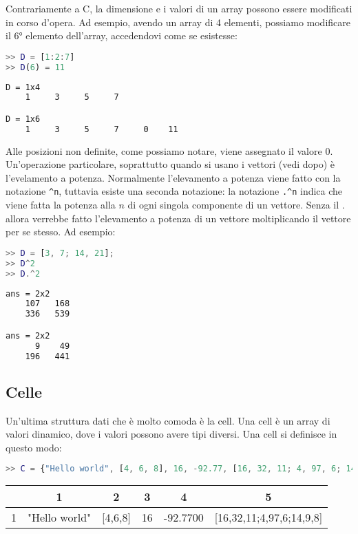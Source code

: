 Contrariamente a C, la dimensione e i valori di un array possono essere modificati in corso d'opera. Ad esempio, avendo un array di 4 elementi, possiamo modificare il 6° elemento dell'array, accedendovi come se esistesse:

\begin{terminal}
    \begin{lstlisting}[language=MATLAB, style=notexterm]
>> D = [1:2:7]
>> D(6) = 11\end{lstlisting}
    \tcblower
    \begin{lstlisting}[style=notexterm, language = tex]
D = 1x4
    1     3     5     7

D = 1x6
    1     3     5     7     0    11\end{lstlisting}
\end{terminal}

Alle posizioni non definite, come possiamo notare, viene assegnato il valore 0.
\nwl
Un'operazione particolare, soprattutto quando si usano i vettori (vedi dopo) è l'evelamento a potenza. Normalmente l'elevamento a potenza viene fatto con la notazione \texttt{\textasciicircum n}, tuttavia esiste una seconda notazione: la notazione \texttt{.\textasciicircum n} indica che viene fatta la potenza alla $n$ di ogni singola componente di un vettore. Senza il . allora verrebbe fatto l'elevamento a potenza di un vettore moltiplicando il vettore per se stesso. Ad esempio:

\begin{terminal}
    \begin{lstlisting}[language=MATLAB, style=notexterm]
>> D = [3, 7; 14, 21];
>> D^2
>> D.^2\end{lstlisting}
    \tcblower
    \begin{lstlisting}[style=notexterm, language = tex]
ans = 2x2
    107   168
    336   539

ans = 2x2
      9    49
    196   441\end{lstlisting}
\end{terminal}

\subsection{Celle}

Un'ultima struttura dati che è molto comoda è la cell. Una cell è un array di valori dinamico, dove i valori possono avere tipi diversi. Una cell si definisce in questo modo:

\begin{terminal}
    \begin{lstlisting}[language=MATLAB, style=notexterm]
>> C = {"Hello world", [4, 6, 8], 16, -92.77, [16, 32, 11; 4, 97, 6; 14, 9, 8]}\end{lstlisting}
    \tcblower
    {
        \color{white} \ttfamily
        \begin{tabular} {|c|c|c|c|c|c|}
        \hline
         & 1 & 2 & 3 & 4 & 5 \\
        \hline
        1 & "Hello world" & [4,6,8] & 16 & -92.7700 & [16,32,11;4,97,6;14,9,8] \\ 
        \hline
        \end{tabular}
    }
\end{terminal}

